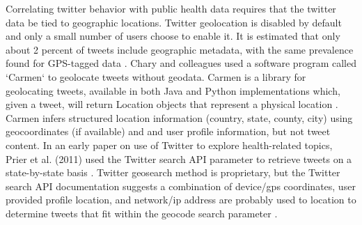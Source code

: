 \documentclass[sigconf]{acmart}
\begin{document}
Correlating twitter behavior with public health data requires that the twitter 
data be tied to geographic locations. Twitter geolocation is disabled by 
default and only a small number of users choose to enable it. It is estimated 
that only about 2 percent of tweets include geographic metadata, with the 
same prevalence found for GPS-tagged data \cite{chary17, leetaru13}. 
Chary and colleagues used a software program called `Carmen` to geolocate 
tweets without geodata. Carmen is a library for geolocating tweets, available 
in both Java and Python implementations which, given a tweet, will return 
Location objects that represent a physical location \cite{dredze13}. Carmen 
infers structured location information (country, state, county, city) using 
geocoordinates (if available) and and user profile information, but not tweet 
content. In an early paper on use of Twitter to explore health-related topics, 
Prier et al. (2011) used the Twitter search API parameter to retrieve tweets 
on a state-by-state basis \cite{prier11}. Twitter geosearch method is 
proprietary, but the Twitter search API documentation suggests a combination 
of device/gps coordinates, user provided profile location, and network/ip 
address are probably used to location to determine tweets that fit within 
the geocode search parameter \cite{twitterGet}.

\end{document}
